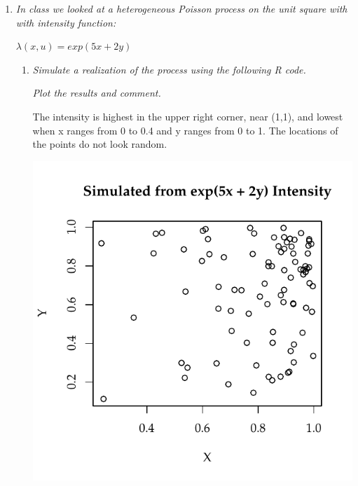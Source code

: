 \documentclass{article}\usepackage[]{graphicx}\usepackage[]{color}
\makeatletter
\def\maxwidth{ %
  \ifdim\Gin@nat@width>\linewidth
    \linewidth
  \else
    \Gin@nat@width
  \fi
}
\newenvironment{knitrout}{}{} %
\makeatother
\begin{document}
\begin{enumerate}
\begin{knitrout}
{}



\end{knitrout}



\item %
{\it In class we looked at a heterogeneous Poisson process on the unit square with with intensity function:}

\begin{center}
$\lambda(x,u) = exp(5x + 2y)$
\end{center}

\begin{enumerate}
\item %
{\it Simulate a realization of the process using the following R code.}


{\it Plot the results and comment.}

The intensity is highest in the upper right corner, near (1,1), and lowest when x ranges from 0 to 0.4 and y ranges from 0 to 1. The locations of the points do not look random.

\begin{knitrout}\footnotesize
{}\color{fgcolor}

{\centering \includegraphics[width=\maxwidth]{figure/prob2a-1} 

}
\end{knitrout}
\end{enumerate}
\end{enumerate}
\end{document}
